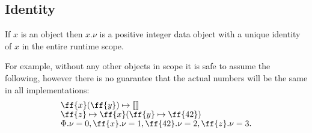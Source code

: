 \subsection{Identity}

\begin{eodefinition}\label{def:identity}
If $x$ is an object then $x.\nu$ is a positive integer data object
with a unique identity of $x$ in the entire runtime scope.
\end{eodefinition}

For example, without any other objects in scope it is safe
to assume the following, however there is no guarantee that
the actual numbers will be the same in all implementations:
\begin{equation}
\begin{split}
& \ff{x}(\ff{y}) \mapsto \llbracket \rrbracket \br
& \ff{z} \mapsto \ff{x} ( \ff{y} \mapsto \ff{42} ) \br
& \Phi.\nu = 0, \ff{x}.\nu = 1, \ff{42}.\nu = 2, \ff{z}.\nu = 3.
\end{split}
\end{equation}

